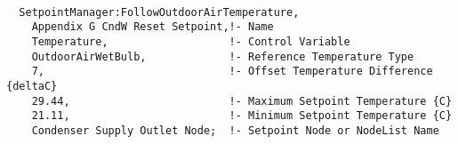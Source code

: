 \begin{lstlisting}

  SetpointManager:FollowOutdoorAirTemperature,
    Appendix G CndW Reset Setpoint,!- Name
    Temperature,                   !- Control Variable
    OutdoorAirWetBulb,             !- Reference Temperature Type
    7,                             !- Offset Temperature Difference {deltaC}
    29.44,                         !- Maximum Setpoint Temperature {C}
    21.11,                         !- Minimum Setpoint Temperature {C}
    Condenser Supply Outlet Node;  !- Setpoint Node or NodeList Name

\end{lstlisting}


